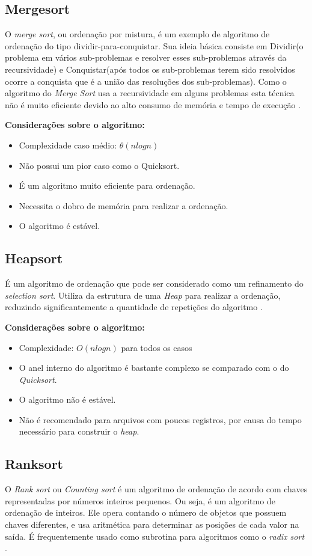 \documentclass[
	11pt,
	oneside,
	a4paper,
	english,
	brazil,
	]{article}
\begin{document}
\subsection{Mergesort}
O \textit{merge sort}, ou ordenação por mistura, é um exemplo de algoritmo de
ordenação do tipo dividir-para-conquistar. Sua ideia básica consiste em
Dividir(o problema em vários sub-problemas e resolver esses sub-problemas
através da recursividade) e Conquistar(após todos os sub-problemas terem
sido resolvidos ocorre a conquista que é a união das resoluções dos
sub-problemas). Como o algoritmo do \textit{Merge Sort} usa a recursividade
em alguns problemas esta técnica não é muito eficiente devido ao alto consumo
de memória e tempo de execução \cite{merge}.

\noindent \textbf{Considerações sobre o algoritmo:}
\begin{itemize}
 \item Complexidade caso médio: $ \theta(n log n) $
 \item Não possui um pior caso como o Quicksort.
 \item É um algoritmo muito eficiente para ordenação.
 \item Necessita o dobro de memória para realizar a ordenação.
 \item O algoritmo é estável.
\end{itemize}

\subsection{Heapsort}
É um algoritmo de ordenação que pode ser considerado como um refinamento do
\textit{selection sort}. Utiliza da estrutura de uma \textit{Heap} para
realizar a ordenação, reduzindo significantemente a quantidade de repetições
do algoritmo \cite{heap}.

\noindent \textbf{Considerações sobre o algoritmo:}
\begin{itemize}
 \item Complexidade: $ O(n log n) $ para todos os casos
 \item O anel interno do algoritmo é bastante complexo se comparado
com o do \textit{Quicksort}.
 \item O algoritmo não é estável.
 \item Não é recomendado para arquivos com poucos registros, por causa
do tempo necessário para construir o \textit{heap}.
\end{itemize}


\subsection{Ranksort}
O \textit{Rank sort} ou \textit{Counting sort} é um algoritmo de ordenação
de acordo com chaves representadas por números inteiros pequenos. Ou seja,
é um algoritmo de ordenação de inteiros. Ele opera contando o número de
objetos que possuem chaves diferentes, e usa aritmética para determinar as
posições de cada valor na saída. É frequentemente usado como subrotina para
algoritmos como o \textit{radix sort} \cite{rank}.
\end{document}
